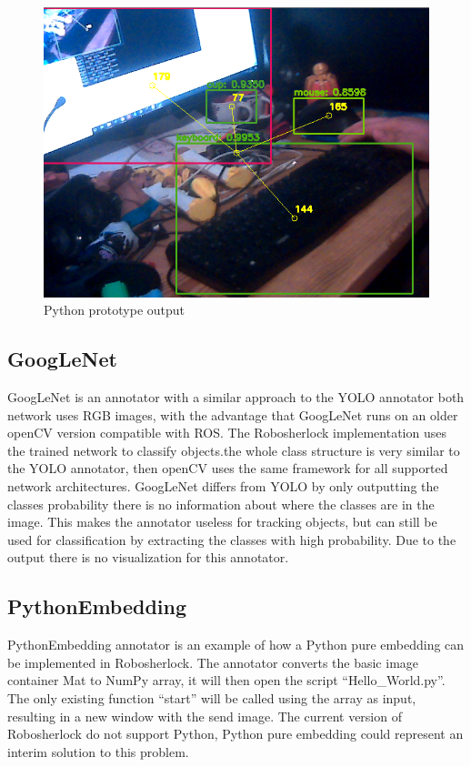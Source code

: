 \documentclass[main.tex]{subfiles}
\begin{document}
\begin{figure}[h]
\caption{Python prototype output}
\centering
\includegraphics[width=1\textwidth]{pictures/perception/YOLO.png}
\end{figure}

				\subsection{GoogLeNet}
GoogLeNet is an annotator with a similar approach to the YOLO annotator both network uses RGB images, with the advantage that GoogLeNet runs on an older openCV version compatible with ROS.
The Robosherlock implementation uses the trained network to classify objects.the whole class structure is very similar to the YOLO annotator, then openCV uses the same framework for all supported network architectures.
GoogLeNet differs from YOLO by only outputting the classes probability there is no information about where the classes are in the image. This makes the annotator useless for tracking objects, but can still be used for classification by extracting the classes with high probability.
Due to the output there is no visualization for this annotator.

				\subsection{PythonEmbedding}
PythonEmbedding annotator is an example of how a Python pure embedding can be implemented in Robosherlock. The annotator converts the basic image container Mat to NumPy array, it will then open the script “Hello\_World.py”. The only existing function “start” will be called using the array as input, resulting in a new window with the send image.
The current version of Robosherlock do not support Python, Python pure embedding could represent an interim solution to this problem.

\endgroup
\end{document}
